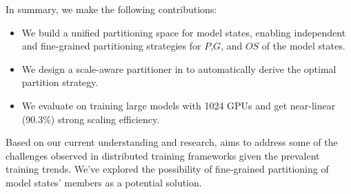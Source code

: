 In summary, we make the following contributions:




\begin{itemize}[leftmargin=*]
      \item 
      We build a unified partitioning space for model states, enabling independent and fine-grained partitioning strategies for $P$,$G$, and $OS$ of the model states. 
        


      
      \item 
      We design a scale-aware partitioner in \SysName to automatically derive the optimal partition strategy. 
      

      \item 
      We evaluate \SysName on training large models with 1024 GPUs and get near-linear (90.3\%) strong scaling efficiency.
\end{itemize}

Based on our current understanding and research, \SysName aims to address some of the challenges observed in distributed training frameworks given the prevalent training trends. We've explored the possibility of fine-grained partitioning of model states' members as a potential solution.


